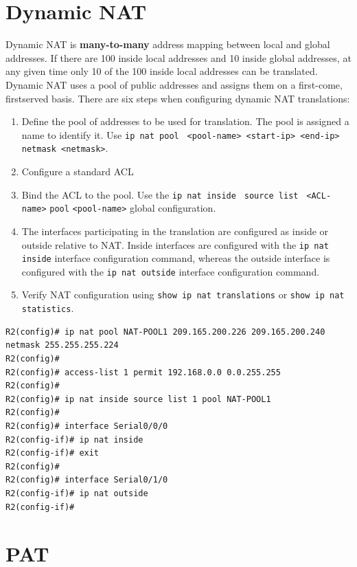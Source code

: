 \section{Dynamic NAT}

Dynamic NAT is \textbf{many-to-many} address mapping between local and global addresses. If there are 100 inside local addresses and 10 inside global addresses, at any given time only 10 of the 100 inside local addresses can be translated. Dynamic NAT uses a pool of public addresses and assigns them on a first-come, firstserved basis. There are six steps when configuring dynamic NAT translations:

\begin{enumerate}
\item Define the pool of addresses to be used for translation. The pool is assigned a name to identify it. Use \verb|ip nat pool | \verb|<pool-name> <start-ip> <end-ip>| \verb|netmask <netmask>|.

\item Configure a standard ACL

\item Bind the ACL to the pool. Use the \verb|ip nat inside | \verb|source list | \verb|<ACL-name>| \verb|pool| \verb|<pool-name>| global configuration.

\item The interfaces participating in the translation are configured as inside or outside relative to NAT. Inside interfaces are configured with the \verb|ip nat inside| interface configuration command, whereas the outside interface is configured with the \verb|ip nat outside| interface configuration command.

\item Verify NAT configuration using \verb|show ip nat translations| or \verb|show ip nat statistics|.
\end{enumerate}

\begin{verbatim}
R2(config)# ip nat pool NAT-POOL1 209.165.200.226 209.165.200.240 netmask 255.255.255.224
R2(config)#
R2(config)# access-list 1 permit 192.168.0.0 0.0.255.255
R2(config)#
R2(config)# ip nat inside source list 1 pool NAT-POOL1
R2(config)#
R2(config)# interface Serial0/0/0
R2(config-if)# ip nat inside
R2(config-if)# exit
R2(config)#
R2(config)# interface Serial0/1/0
R2(config-if)# ip nat outside
R2(config-if)#
\end{verbatim}

\section{PAT}

